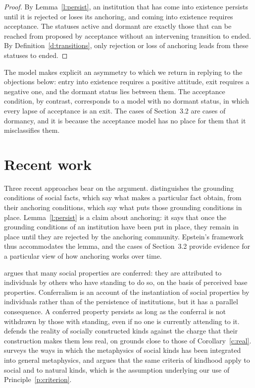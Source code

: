 \documentclass{situationist-preprint}
\begin{document}
\begin{proof}
By Lemma~\ref{l:persist}, an institution that has come into existence persists until it is rejected or loses its anchoring, and coming into existence requires acceptance. The statuses active and dormant are exactly those that can be reached from proposed by acceptance without an intervening transition to ended. By Definition~\ref{d:transitions}, only rejection or loss of anchoring leads from these statuses to ended.
\end{proof}

The model makes explicit an asymmetry to which we return in replying to the objections below: entry into existence requires a positive attitude, exit requires a negative one, and the dormant status lies between them. The acceptance condition, by contrast, corresponds to a model with no dormant status, in which every lapse of acceptance is an exit. The cases of Section~3.2 are cases of dormancy, and it is because the acceptance model has no place for them that it misclassifies them.

\section{Recent work}

Three recent approaches bear on the argument. \citet{Epstein2015} distinguishes the grounding conditions of social facts, which say what makes a particular fact obtain, from their anchoring conditions, which say what puts those grounding conditions in place. Lemma~\ref{l:persist} is a claim about anchoring: it says that once the grounding conditions of an institution have been put in place, they remain in place until they are rejected by the anchoring community. Epstein's framework thus accommodates the lemma, and the cases of Section~3.2 provide evidence for a particular view of how anchoring works over time.

\citet{Asta2018} argues that many social properties are conferred: they are attributed to individuals by others who have standing to do so, on the basis of perceived base properties. Conferralism is an account of the instantiation of social properties by individuals rather than of the persistence of institutions, but it has a parallel consequence. A conferred property persists as long as the conferral is not withdrawn by those with standing, even if no one is currently attending to it. \citet{Haslanger2012} defends the reality of socially constructed kinds against the charge that their construction makes them less real, on grounds close to those of Corollary~\ref{c:real}. \citet{Mason2016} surveys the ways in which the metaphysics of social kinds has been integrated into general metaphysics, and argues that the same criteria of kindhood apply to social and to natural kinds, which is the assumption underlying our use of Principle~\ref{p:criterion}.
\end{document}
